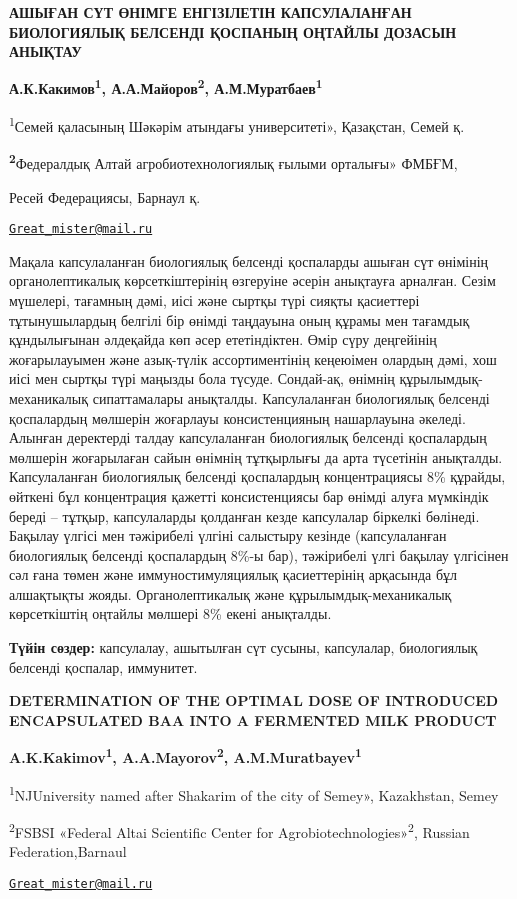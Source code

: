 \begin{center}
{\large\bfseries АШЫҒАН СҮТ ӨНІМГЕ ЕНГІЗІЛЕТІН КАПСУЛАЛАНҒАН БИОЛОГИЯЛЫҚ БЕЛСЕНДІ
ҚОСПАНЫҢ ОҢТАЙЛЫ ДОЗАСЫН АНЫҚТАУ}

{\bfseries А.К.Какимов\textsuperscript{1}, А.А.Майоров\textsuperscript{2},
А.М.Муратбаев\textsuperscript{1 }}

\textsuperscript{1}Семей қаласының Шәкәрім атындағы университеті», Қазақстан, Семей қ.

{\bfseries \textsuperscript{2}}Федералдық Алтай агробиотехнологиялық ғылыми
орталығы» ФМБҒМ,

Ресей Федерациясы, Барнаул қ.

\href{mailto:Great_mister@mail.ru}{\nolinkurl{Great\_mister@mail.ru}}
\end{center}

Мақала капсулаланған биологиялық белсенді қоспаларды ашыған сүт өнімінің
органолептикалық көрсеткіштерінің өзгеруіне әсерін анықтауға арналған.
Сезім мүшелері, тағамның дәмі, иісі және сыртқы түрі сияқты қасиеттері
тұтынушылардың белгілі бір өнімді таңдауына оның құрамы мен тағамдық
құндылығынан әлдеқайда көп әсер ететіндіктен. Өмір сүру деңгейінің
жоғарылауымен және азық-түлік ассортиментінің кеңеюімен олардың дәмі,
хош иісі мен сыртқы түрі маңызды бола түсуде. Сондай-ақ, өнімнің
құрылымдық-механикалық сипаттамалары анықталды. Капсулаланған
биологиялық белсенді қоспалардың мөлшерін жоғарлауы консистенцияның
нашарлауына әкеледі. Алынған деректерді талдау капсулаланған биологиялық
белсенді қоспалардың мөлшерін жоғарылаған сайын өнімнің тұтқырлығы да
арта түсетінін анықталды. Капсулаланған биологиялық белсенді қоспалардың
концентрациясы 8\% құрайды, өйткені бұл концентрация қажетті
консистенциясы бар өнімді алуға мүмкіндік береді -- тұтқыр, капсулаларды
қолданған кезде капсулалар біркелкі бөлінеді. Бақылау үлгісі мен
тәжірибелі үлгіні салыстыру кезінде (капсулаланған биологиялық белсенді
қоспалардың 8\%-ы бар), тәжірибелі үлгі бақылау үлгісінен сәл ғана төмен
және иммуностимуляциялық қасиеттерінің арқасында бұл алшақтықты жояды.
Органолептикалық және құрылымдық-механикалық көрсеткіштің оңтайлы
мөлшері 8\% екені анықталды.

{\bfseries Түйін сөздер:} капсулалау, ашытылған сүт сусыны, капсулалар,
биологиялық белсенді қоспалар, иммунитет.

\begin{center}
{\large\bfseries DETERMINATION OF THE OPTIMAL DOSE OF INTRODUCED ENCAPSULATED BAA
INTO A FERMENTED MILK PRODUCT}

{\bfseries A.K.Kakimov\textsuperscript{1}, A.A.Mayorov\textsuperscript{2},
A.M.Muratbayev\textsuperscript{1}}

\textsuperscript{1}NJUniversity named after Shakarim of the city of
Semey», Kazakhstan, Semey

\textsuperscript{2}FSBSI «Federal Altai Scientific Center for
Agrobiotechnologies»\textsuperscript{2}, Russian Federation,Barnaul

\href{mailto:Great_mister@mail.ru}{\nolinkurl{Great\_mister@mail.ru}}
\end{center}

